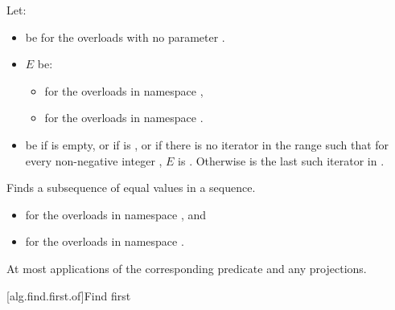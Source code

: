 \begin{itemdescr}
\pnum
Let:
\begin{itemize}
\item {} be  for the overloads with no parameter
.

\item $E$ be:
\begin{itemize}
\item {}
for the overloads in namespace ,

\item {}
for the overloads in namespace .
\end{itemize}

\item {} be  if  is empty,
or if  is ,
or if there is no iterator
in the range 
such that for every non-negative integer
, $E$ is .
Otherwise  is the last such iterator
in .
\end{itemize}

\pnum
\effects
Finds a subsequence of equal values in a sequence.

\pnum
\returns
\begin{itemize}
\item {} for the overloads in namespace , and
\item {}
  for the overloads in namespace .
\end{itemize}

\pnum
\complexity
At most
applications of the corresponding predicate and any projections.
\end{itemdescr}

[alg.find.first.of]{Find first}

